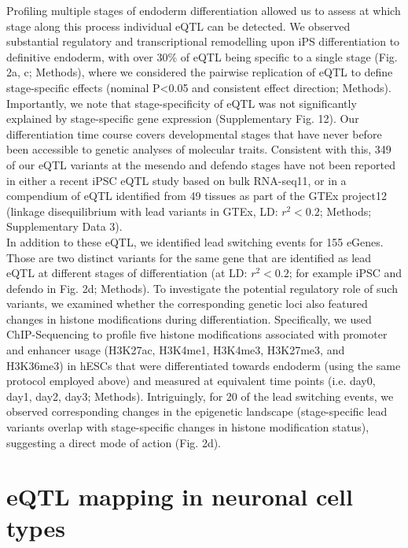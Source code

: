 Profiling multiple stages of endoderm differentiation allowed us to assess at which stage along this process individual eQTL can be detected. 
We observed substantial regulatory and transcriptional remodelling upon iPS differentiation to definitive endoderm, with over 30\% of eQTL being specific to a single stage (Fig. 2a, c; Methods), where we considered the pairwise replication of eQTL to define stage-specific effects (nominal P<0.05 and consistent effect direction; Methods). 
Importantly, we note that stage-specificity of eQTL was not significantly explained by stage-specific gene expression (Supplementary Fig. 12). 
Our differentiation time course covers developmental stages that have never before been accessible to genetic analyses of molecular traits. 
Consistent with this, 349 of our eQTL variants at the mesendo and defendo stages have not been reported in either a recent iPSC eQTL study based on bulk RNA-seq11, or in a compendium of eQTL identified from 49 tissues as part of the GTEx project12 (linkage disequilibrium with lead variants in GTEx, LD: $r^2<0.2$; Methods; Supplementary Data 3).\\

In addition to these eQTL, we identified lead switching events for 155 eGenes. 
Those are two distinct variants for the same gene that are identified as lead eQTL at different stages of differentiation (at LD: $r^2<0.2$; for example iPSC and defendo in Fig. 2d; Methods). 
To investigate the potential regulatory role of such variants, we examined whether the corresponding genetic loci also featured changes in histone modifications during differentiation. 
Specifically, we used ChIP-Sequencing to profile five histone modifications associated with promoter and enhancer usage (H3K27ac, H3K4me1, H3K4me3, H3K27me3, and H3K36me3) in hESCs that were differentiated towards endoderm (using the same protocol employed above) and measured at equivalent time points (i.e. day0, day1, day2, day3; Methods). 
Intriguingly, for 20 of the lead switching events, we observed corresponding changes in the epigenetic landscape (stage-specific lead variants overlap with stage-specific changes in histone modification status), suggesting a direct mode of action (Fig. 2d).

\section{eQTL mapping in neuronal cell types}

